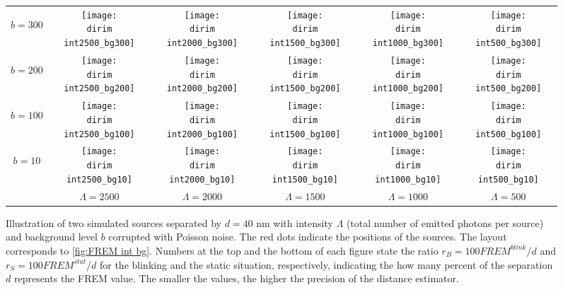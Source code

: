 \begin{figure}[!hbt]
	\centering
	\newcommand{\wf}{.14\textwidth}
	\newcommand{\dirim}{\qd gFREM/images/psf2/text_twosources_}
	\newcommand{\vs}{.4}
	\begin{tabular}{c|ccccc}
		\begin{sideways}\hspace{\vs cm}$b=300$\end{sideways}
		&\texttt{[image: \\dirim int2500\_bg300]}
		&\texttt{[image: \\dirim int2000\_bg300]}
		&\texttt{[image: \\dirim int1500\_bg300]}
		&\texttt{[image: \\dirim int1000\_bg300]}
		&\texttt{[image: \\dirim int500\_bg300]}\\
		\begin{sideways}\hspace{\vs cm}$b=200$\end{sideways}
		&\texttt{[image: \\dirim int2500\_bg200]}
		&\texttt{[image: \\dirim int2000\_bg200]}
		&\texttt{[image: \\dirim int1500\_bg200]}
		&\texttt{[image: \\dirim int1000\_bg200]}
		&\texttt{[image: \\dirim int500\_bg200]}\\
		\begin{sideways}\hspace{\vs cm}$b=100$\end{sideways}
		&\texttt{[image: \\dirim int2500\_bg100]}
		&\texttt{[image: \\dirim int2000\_bg100]}
		&\texttt{[image: \\dirim int1500\_bg100]}
		&\texttt{[image: \\dirim int1000\_bg100]}
		&\texttt{[image: \\dirim int500\_bg100]}\\
		\begin{sideways}\hspace{\vs cm}$b=10$\end{sideways}
		&\texttt{[image: \\dirim int2500\_bg10]}
		&\texttt{[image: \\dirim int2000\_bg10]}
		&\texttt{[image: \\dirim int1500\_bg10]}
		&\texttt{[image: \\dirim int1000\_bg10]}
		&\texttt{[image: \\dirim int500\_bg10]}\\
		\hline	
		&$\Lambda=2500$ & $\Lambda=2000$ & $\Lambda=1500$ & $\Lambda=1000$ & $\Lambda=500$\\
	\end{tabular}
	\caption{Illustration of two simulated sources separated by $d=40$ nm  with intensity $\Lambda$ (total number of emitted photons per source) and background level $b$ corrupted with Poisson noise. The red dots indicate the positions of the sources. The layout corresponds to \autoref{fig:FREM int bg}. Numbers at the top and the bottom of each figure state the ratio $r_B=100\unit{FREM}^{blink}/d$ and $r_S=100\unit{FREM}^{stat}/d$ for the blinking and the static situation, respectively, indicating the how many percent of the separation $d$ represents the FREM value. The smaller the values, the higher the precision of the distance estimator.}
	\label{fig:two sources int bg}
\end{figure}
